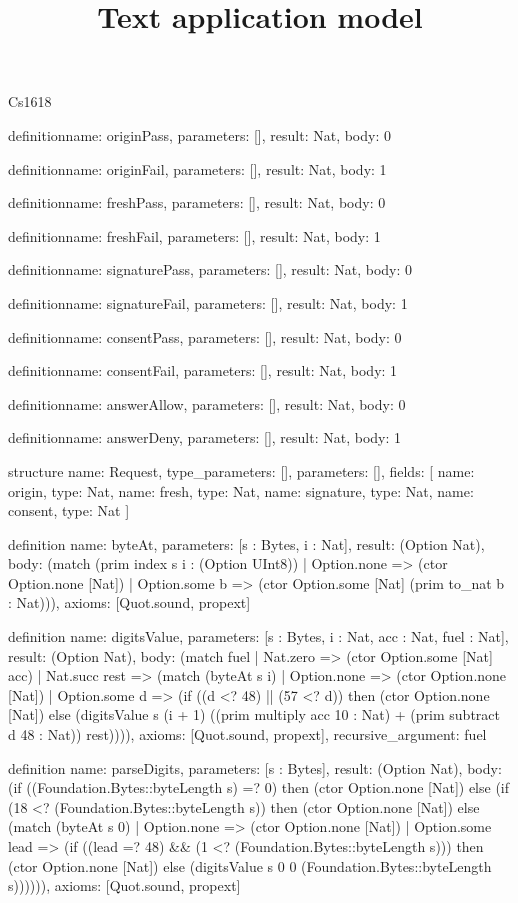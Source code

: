 \begin{lexlean}{Cs1618}
\title{Text application model}
\begin{semanticmodule}
definition{name: originPass, parameters: [], result: Nat, body: 0}

definition{name: originFail, parameters: [], result: Nat, body: 1}

definition{name: freshPass, parameters: [], result: Nat, body: 0}

definition{name: freshFail, parameters: [], result: Nat, body: 1}

definition{name: signaturePass, parameters: [], result: Nat, body: 0}

definition{name: signatureFail, parameters: [], result: Nat, body: 1}

definition{name: consentPass, parameters: [], result: Nat, body: 0}

definition{name: consentFail, parameters: [], result: Nat, body: 1}

definition{name: answerAllow, parameters: [], result: Nat, body: 0}

definition{name: answerDeny, parameters: [], result: Nat, body: 1}

structure{
  name: Request,
  type_parameters: [],
  parameters: [],
  fields: [
    {name: origin, type: Nat},
    {name: fresh, type: Nat},
    {name: signature, type: Nat},
    {name: consent, type: Nat}
  ]
}

definition{
  name: byteAt,
  parameters: [s : Bytes, i : Nat],
  result: (Option Nat),
  body: (match (prim index s i : (Option UInt8))
    | Option.none => (ctor Option.none [Nat])
    | Option.some b => (ctor Option.some [Nat] (prim to_nat b : Nat))),
  axioms: [Quot.sound, propext]
}

definition{
  name: digitsValue,
  parameters: [s : Bytes, i : Nat, acc : Nat, fuel : Nat],
  result: (Option Nat),
  body: (match fuel
    | Nat.zero => (ctor Option.some [Nat] acc)
    | Nat.succ rest => (match (byteAt s i)
      | Option.none => (ctor Option.none [Nat])
      | Option.some d => (if ((d <? 48) || (57 <? d)) then (ctor Option.none [Nat]) else (digitsValue s (i + 1) ((prim multiply acc 10 : Nat) + (prim subtract d 48 : Nat)) rest)))),
  axioms: [Quot.sound, propext],
  recursive_argument: fuel
}

definition{
  name: parseDigits,
  parameters: [s : Bytes],
  result: (Option Nat),
  body: (if ((Foundation.Bytes::byteLength s) =? 0) then (ctor Option.none [Nat]) else (if (18 <? (Foundation.Bytes::byteLength s)) then (ctor Option.none [Nat]) else (match (byteAt s 0)
    | Option.none => (ctor Option.none [Nat])
    | Option.some lead => (if ((lead =? 48) && (1 <? (Foundation.Bytes::byteLength s))) then (ctor Option.none [Nat]) else (digitsValue s 0 0 (Foundation.Bytes::byteLength s)))))),
  axioms: [Quot.sound, propext]
}


\end{semanticmodule}
\end{lexlean}
